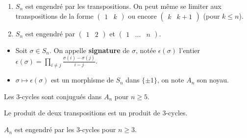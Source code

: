 
  \begin{proposition}
    \begin{enumerate}[label=(\roman*)]
      \item $S_n$ est engendré par les transpositions. On peut même se limiter aux transpositions de la forme $\begin{pmatrix} 1 & k \end{pmatrix}$ ou encore  $\begin{pmatrix} k & k+1 \end{pmatrix}$ (pour $k \leq n$).
      \item $S_n$ est engendré par $\begin{pmatrix} 1 & 2 \end{pmatrix}$ et $\begin{pmatrix} 1 & \dots & n \end{pmatrix}$.
    \end{enumerate}
  \end{proposition}


  \begin{definition}
    \begin{itemize}
      \item Soit $\sigma \in S_n$. On appelle \textbf{signature} de $\sigma$, notée $\epsilon(\sigma)$ l'entier $\epsilon(\sigma) = \prod_{i \neq j} \frac{\sigma(i) - \sigma(j)}{i-j}$.
      \item $\sigma \mapsto \epsilon(\sigma)$ est un morphisme de $S_n$ dans $\{ \pm 1 \}$, on note $A_n$ son noyau.
    \end{itemize}
  \end{definition}


  \begin{lemma}
    Les $3$-cycles sont conjugués dans $A_n$ pour $n \geq 5$.
  \end{lemma}


  \begin{lemma}
    Le produit de deux transpositions est un produit de $3$-cycles.
  \end{lemma}

  \begin{proposition}
    $A_n$ est engendré par les $3$-cycles pour $n \geq 3$.
  \end{proposition}

